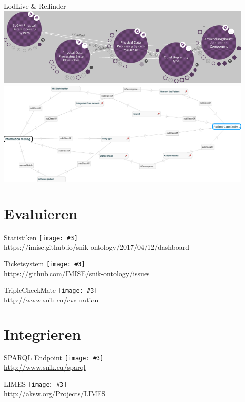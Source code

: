 \documentclass[aspectratio=43]{beamer}
\newcommand{\imageslide}[3][]
{
\begin{frame}{#2}
\centering\texttt{[image: \#3]}
\\#1
\end{frame}
}
\begin{document}
\begin{frame}{LodLive \& Relfinder}
\centering
\includegraphics[width=0.95\textwidth]{img/lodlive.png}\\
\includegraphics[width=0.95\textwidth]{img/relfinder.png}
\end{frame}

\section{Evaluieren}

\imageslide[https://imise.github.io/snik-ontology/2017/04/12/dashboard]{Statistiken}{img/dashboard-medley.png}
\imageslide[\url{https://github.com/IMISE/snik-ontology/issues}]{Ticketsystem}{img/gitissue.png}
\imageslide[\url{http://www.snik.eu/evaluation}]{TripleCheckMate}{img/triplecheckmate.png}

\section{Integrieren}

\imageslide[\url{http://www.snik.eu/sparql}]{SPARQL Endpoint}{img/sparqlresult.png}

\imageslide[http://aksw.org/Projects/LIMES]{LIMES}{img/limes.png}

\end{document}
